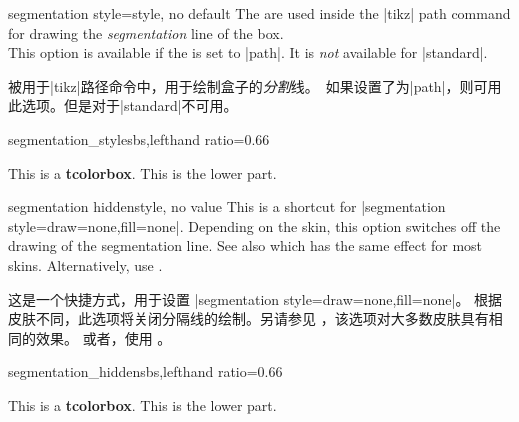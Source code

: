 \begin{docTcbKey}{segmentation style}{=}{style, no default}
The  are used inside the |tikz| path command
for drawing the \emph{segmentation} line of the box.\\
This option is available if the 
is set to |path|.
It is \emph{not} available for |standard|.

被用于|tikz|路径命令中，用于绘制盒子的\emph{分割}线。\ 如果设置了为|path|，则可用此选项。但是对于|standard|不可用。
\begin{exdispExample*}{segmentation_style}{sbs,lefthand ratio=0.66}

\begin{tcolorbox}[enhanced,title=My title,
segmentation style={double=white,draw=blue,
                double distance=1pt,solid}]
This is a \textbf{tcolorbox}.
\tcblower
This is the lower part.
\end{tcolorbox}
\end{exdispExample*}
\end{docTcbKey}

\begin{docTcbKey}{segmentation hidden}{}{style, no value}
This is a shortcut for |segmentation style={draw=none,fill=none}|.
Depending on the skin, this option switches off the drawing of the
segmentation line. See also  which
has the same effect for most skins.
Alternatively, use .

这是一个快捷方式，用于设置 |segmentation style={draw=none,fill=none}|。 根据皮肤不同，此选项将关闭分隔线的绘制。另请参见 ，该选项对大多数皮肤具有相同的效果。 或者，使用 。
\begin{exdispExample*}{segmentation_hidden}{sbs,lefthand ratio=0.66}

\begin{tcolorbox}[title=My title,
enhanced,segmentation hidden]
This is a \textbf{tcolorbox}.
\tcblower
This is the lower part.
\end{tcolorbox}
\end{exdispExample*}
\end{docTcbKey}


